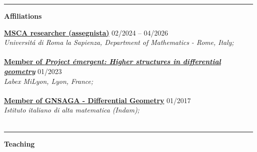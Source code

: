 \documentclass[a4paper]{article}
\newcommand{\block}[1]{\hrule \vspace{0.2cm} \textbf{\Large #1} \vspace{0.2cm}}
\newcommand{\voice}[5]{\href{#4}{\textbf{#1}} \hfill #2 \\ \textit{#3} \\ {\small #5} \vspace{0.2cm} \\}
\begin{document}
\vspace{1em}




    \block{Affiliations}

    
    \voice{MSCA researcher (assegnista)}
        {02/2024 -- 04/2026}
        {Universit\'a di Roma la Sapienza, Department of Mathematics - Rome, Italy;}
        {https://www.mat.uniroma1.it/persone/miti}       
        {\vspace{-0.5cm}}
    \voice{Member of \emph{Project \'emergent: Higher structures in differential geometry}}
        {01/2023}
        {Labex MiLyon, Lyon, France;}
        {https://www.dropbox.com/s/36kh0vre45r38b2/2301-MiLyon-HigherGeometry.pdf?dl=0}       
        {\vspace{-0.5cm}}
    \voice{Member of GNSAGA - Differential Geometry}
        {01/2017}
        {Istituto italiano di alta matematica (Indam);}
        {https://web.archive.org/web/20170924125645/http://www.altamatematica.it/gnsaga/node/23}       
        {\vspace{-0.5cm}}





    \block{Teaching}
\end{document}
